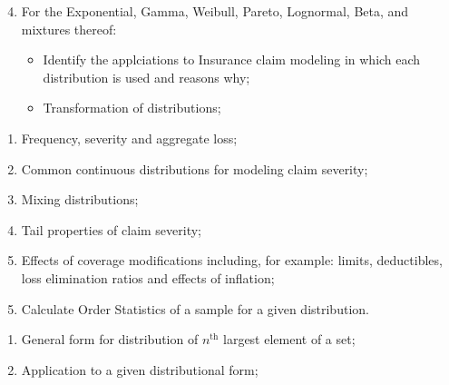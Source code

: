 \begin{outcomes}
	\begin{enumerate}
  \setcounter{enumi}{3}
	\item	For the Exponential, Gamma, Weibull, Pareto, Lognormal, Beta, and mixtures thereof:
		\begin{itemize}
		\item	Identify the applciations to Insurance claim modeling in which each distribution is used and reasons why;
		\item	Transformation of distributions; 
		\end{itemize}
	\end{enumerate}
\end{outcomes}
\begin{knowledge}
	\begin{enumerate}[label = \alph*.]
	\item	Frequency, severity and aggregate loss;
	\item	Common continuous distributions for modeling claim severity;
	\item	Mixing distributions;
	\item	Tail properties of claim severity;
	\item	Effects of coverage modifications including, for example: limits, deductibles, loss elimination ratios and effects of inflation;
	\end{enumerate}
\end{knowledge}

\begin{outcomes}
	\begin{enumerate}
  \setcounter{enumi}{4}
	\item	Calculate Order Statistics of a sample for a given distribution.
	\end{enumerate}
\end{outcomes}
\begin{knowledge}
	\begin{enumerate}[label = \alph*.]
	\item	General form for distribution of $n^{\text{th}}$ largest element of a set;
	\item	Application to a given distributional form;
	\end{enumerate}
\end{knowledge}

